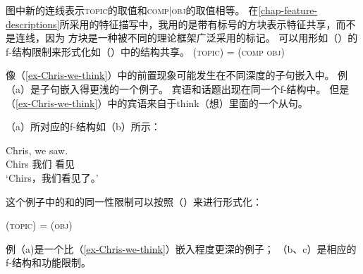 \noindent
图中新的连线表示\textsc{topic}的取值和\textsc{comp$|$obj}的取值相等。
在\ref{chap-feature-descriptions}所采用的特征描写中，我用的是带有标号的方块表示特征共享，而不是连线，因为
方块是一种被不同的理论框架广泛采用的标记。
可以用形如（）的f-结构限制来形式化如（）中的结构共享。 
\ea
\label{Topic-Comp-Obj}
(\upsp  \textsc{topic}) = (\upsp \textsc{comp obj})
\z

\noindent
像（\ref{ex-Chris-we-think}）中的前置现象可能发生在不同深度的子句嵌入中。
例（a）是子句嵌入得更浅的一个例子。
宾语和话题出现在同一个f-结构中。
但是（\ref{ex-Chris-we-think}）中的宾语来自于think（想）里面的一个从句。

（a）所对应的f-结构如（b）所示：

\eal
\ex 
\gll Chris, we saw.\\
Chirs 我们 看见\\
\glt `Chirs，我们看见了。'
\ex 
{}
\zl

\noindent
这个例子中的\topic{}和\lfgobj 的同一性限制可以按照（）来进行形式化：

\ea
\label{Topic-Obj}
(\upsp  \textsc{topic}) = (\upsp \textsc{obj})
\z

\noindent
例（a)是一个比（\ref{ex-Chris-we-think}）嵌入程度更深的例子；
（b、c）是相应的f-结构和功能限制。

